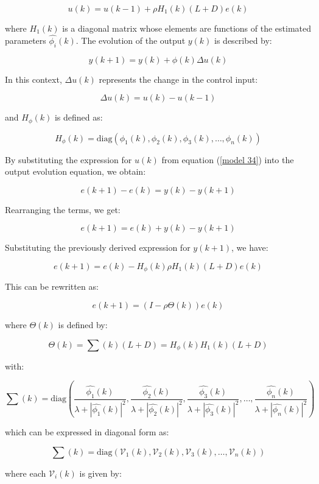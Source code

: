 \documentclass[journal,onecolumn]{IEEEtran}
\begin{document}
\begin{equation}
    \label{model 34}
    u(k) = u(k-1) + \rho H_1(k) (L + D) e(k)
\end{equation}

where \(H_1(k)\) is a diagonal matrix whose elements are functions of the estimated parameters \(\hat{\phi_i}(k)\). The evolution of the output \(y(k)\) is described by:

\[
y(k+1) = y(k) + \phi(k) \Delta u(k)
\]

In this context, \(\Delta u(k)\) represents the change in the control input:

\[
\Delta u(k) = u(k) - u(k-1)
\]

and \(H_\phi(k)\) is defined as:

\[
H_\phi(k) = \text{diag}(\phi_1(k), \phi_2(k), \phi_3(k), \dots, \phi_n(k))
\]

By substituting the expression for \(u(k)\) from equation (\ref{model 34}) into the output evolution equation, we obtain:

\[
e(k+1) - e(k) = y(k) - y(k+1)
\]

Rearranging the terms, we get:

\[
e(k+1) = e(k) + y(k) - y(k+1)
\]

Substituting the previously derived expression for \(y(k+1)\), we have:

\[
e(k+1) = e(k) - H_\phi(k) \rho H_1(k) (L + D) e(k)
\]

This can be rewritten as:

\begin{equation}
    \label{model 35}
    e(k+1) = (I - \rho \Theta(k)) e(k)
\end{equation}

where \(\Theta(k)\) is defined by:

\[
\Theta(k) = \sum(k) (L + D) = H_\phi(k) H_1(k) (L + D)
\]

with:

\[
\sum(k) = \text{diag}\left(\frac{\hat{\phi_1}(k)}{\lambda + |\hat{\phi_1}(k)|^2}, \frac{\hat{\phi_2}(k)}{\lambda + |\hat{\phi_2}(k)|^2}, \frac{\hat{\phi_3}(k)}{\lambda + |\hat{\phi_3}(k)|^2}, \dots, \frac{\hat{\phi_n}(k)}{\lambda + |\hat{\phi_n}(k)|^2}\right)
\]

which can be expressed in diagonal form as:

\[
\sum(k) = \text{diag}(\mathcal{V}_1(k), \mathcal{V}_2(k), \mathcal{V}_3(k), \dots, \mathcal{V}_n(k))
\]

where each \(\mathcal{V}_i(k)\) is given by:
\end{document}
